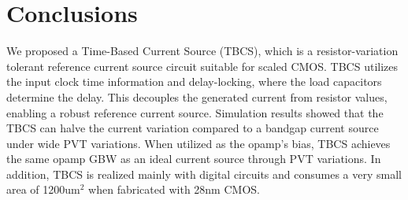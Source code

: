 \documentclass[paper]{ieice}
\begin{document}
\section{Conclusions}
\qquad We proposed a Time-Based Current Source (TBCS), which is a resistor-variation tolerant reference current source circuit suitable for scaled CMOS. TBCS utilizes the input clock time information and delay-locking, where the load capacitors determine the delay. This decouples the generated current from resistor values, enabling a robust reference current source.  Simulation results showed that the TBCS can halve the current variation compared to a bandgap current source under wide PVT variations. When utilized as the opamp's bias, TBCS achieves the same opamp GBW as an ideal current source through PVT variations. In addition, TBCS is realized mainly with digital circuits and consumes a very small area of 1200um$^2$ when fabricated with 28nm CMOS.




\label{profile}
\end{document}

